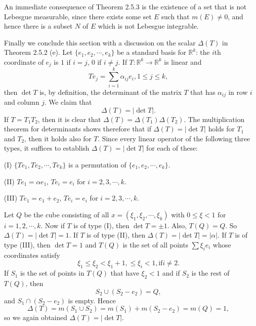 An immediate consequence of Theorem 2.5.3 is the existence of a set that is not Lebesgue measurable, since there exists some set $E$ such that $m(E)\ne 0$, and hence there is a subset $N$ of $E$ which is not Lebesgue integrable.\par
Finally we conclude this section with a discussion on the scalar $\Delta(T)$ in Theorem 2.5.2 (e). Let $\{e_1,e_2,\cdots,e_k\}$ be a standard basis for $\mathbb{R}^k$: the $i$th coordinate of $e_j$ is $1$ if $i=j$, $0$ if $i\ne j$. If $T:\mathbb{R}^k\to\mathbb{R}^k$ is linear and 
$$Te_j=\sum_{i=1}^k\alpha_{ij}e_i,1\le j\le k,$$
then $\det T$ is, by definition, the determinant of the matrix $T$ that has $\alpha_{ij}$ in row $i$ and column $j$. We claim that 
$$\Delta(T)=|\det T|.$$
If $T=T_1T_2$, then it is clear that $\Delta(T)=\Delta(T_1)\Delta(T_2)$. The multiplication theorem for determinants shows therefore that if $\Delta(T)=|\det T|$ holds for $T_1$ and $T_2$, then it holds also for $T$. Since every linear operator of the following three types, it suffices to establish $\Delta(T)=|\det T|$ for each of these:\par
(I) $\{Te_1,Te_2,\cdots,Te_k\}$ is a permutation of $\{e_1,e_2,\cdots,e_k\}$.\par
(II) $Te_1=\alpha e_1$, $Te_i=e_i$ for $i=2,3,\cdots,k$.\par
(III) $Te_1=e_1+e_2$, $Te_i=e_i$ for $i=2,3,\cdots,k$.\par
Let $Q$ be the cube consisting of all $x=(\xi_1,\xi_2,\cdots,\xi_k)$ with $0\le\xi<1$ for $i=1,2,\cdots,k$. Now if $T$ is of type (I), then $\det T=\pm 1$. Also, $T(Q)=Q$. So $\Delta(T)=|\det T|=1$. If $T$ is of type (II), then $\Delta(T)=|\det T|=|\alpha|$. If $T$ is of type (III), then $\det T=1$ and $T(Q)$ is the set of all points $\sum\xi_ie_i$ whose coordinates satisfy
$$\xi_1\le\xi_2<\xi_1+1,\le\xi_i<1, \text{if}i\ne 2.$$
If $S_1$ is the set of points in $T(Q)$ that have $\xi_2<1$ and if $S_2$ is the rest of $T(Q)$, then 
$$S_2\cup(S_2-e_2)=Q,$$
and $S_1\cap(S_2-e_2)$ is empty. Hence 
$$\Delta(T)=m(S_1\cup S_2)=m(S_1)+m(S_2-e_2)=m(Q)=1,$$
so we again obtained $\Delta(T)=|\det T|$.
